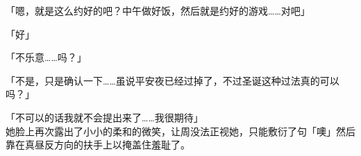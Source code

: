 「嗯，就是这么约好的吧？中午做好饭，然后就是约好的游戏……对吧」

「好」

「不乐意……吗？」

「不是，只是确认一下……虽说平安夜已经过掉了，不过圣诞这种过法真的可以吗？」

「不可以的话我就不会提出来了……我很期待」\\

她脸上再次露出了小小的柔和的微笑，让周没法正视她，只能敷衍了句「噢」然后靠在真昼反方向的扶手上以掩盖住羞耻了。\\

